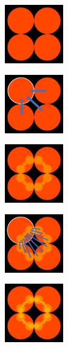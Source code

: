 \begin{figure}[htbp]
 \begin{minipage}[t]{0.16\hsize}
  \center
  \includegraphics[width=1in, height=1in, keepaspectratio]{./img/preparation/orbit/level0c.pdf}
  \subcaption{}
  \label{fig:level0}
 \end{minipage}
 \begin{minipage}[t]{0.16\hsize}
  \center
  \includegraphics[width=1in, height=1in, keepaspectratio]{./img/preparation/orbit/level0invc.pdf}
  \subcaption{}
   \label{fig:level0inv}
 \end{minipage}
 \begin{minipage}[t]{0.16\hsize}
  \center
  \includegraphics[width=1in, height=1in, keepaspectratio]{./img/preparation/orbit/level1c.pdf}
  \subcaption{}
   \label{fig:level1}
 \end{minipage}
 \begin{minipage}[t]{0.16\hsize}
  \center
  \includegraphics[width=1in, height=1in,
  keepaspectratio]{./img/preparation/orbit/level1invc.pdf}
  \subcaption{}
  \label{fig:level1inv}
 \end{minipage}
 \begin{minipage}[t]{0.16\hsize}
  \center
  \includegraphics[width=1in, height=1in, keepaspectratio]{./img/preparation/orbit/level2c.pdf}

\end{minipage}
\end{figure}
